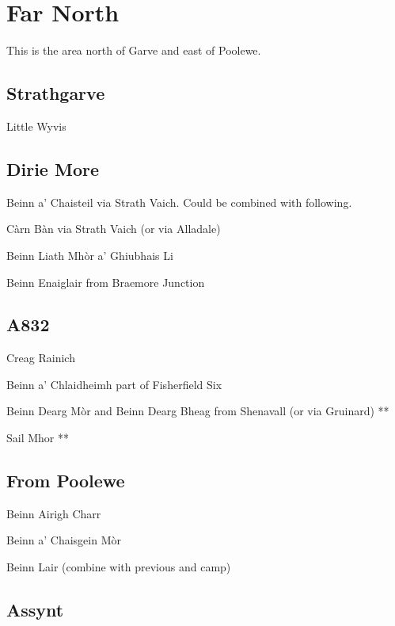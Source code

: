 \section{Far North}

This is the area north of Garve and east of Poolewe. 

\subsection{Strathgarve}

Little Wyvis


\subsection{Dirie More}

Beinn a' Chaisteil via Strath Vaich.  Could be combined with following. 

Càrn Bàn via Strath Vaich (or via Alladale)

Beinn Liath Mhòr a' Ghiubhais Li


Beinn Enaiglair from Braemore Junction


\subsection{A832}

Creag Rainich

Beinn a' Chlaidheimh part of Fisherfield Six

Beinn Dearg Mòr and Beinn Dearg Bheag from Shenavall (or via Gruinard) **

Sail Mhor **


\subsection{From Poolewe}

Beinn Airigh Charr

Beinn a' Chaisgein Mòr

Beinn Lair (combine with previous and camp)



\subsection{Assynt}

